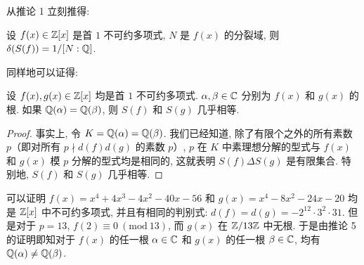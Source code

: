 从推论 1 立刻推得: 

\begin{corollary}[4]
设 $f(x)\in\mathbb{Z}[x]$ 是首 $1$ 不可约多项式, $N$ 是 $f(x)$ 的分裂域, 则 $\delta(S(f))=1/[N:\mathbb{Q}]$. 
\end{corollary}

同样地可以证得: 

\begin{corollary}[5]
设 $f(x),g(x)\in\mathbb{Z}[x]$ 均是首 $1$ 不可约多项式. $\alpha,\beta\in\mathbb{C}$ 分别为 $f(x)$ 和 $g(x)$ 的根. 如果 $\mathbb{Q}(\alpha)=\mathbb{Q}(\beta)$, 则 $S(f)$ 和 $S(g)$ 几乎相等. 
\end{corollary}

\begin{proof}
事实上, 令 $K=\mathbb{Q}(\alpha)=\mathbb{Q}(\beta)$. 我们已经知道, 除了有限个之外的所有素数 $p$（即对所有 $p\nmid d(f)d(g)$ 的素数 $p$）, $p$ 在 $K$ 中素理想分解的型式与 $f(x)$ 和 $g(x)$ 模 $p$ 分解的型式均是相同的, 这就表明 $S(f)\Delta S(g)$ 是有限集合. 特别地, $S(f)$ 和 $S(g)$ 几乎相等. 
\end{proof}

\begin{example}
可以证明 $f(x)=x^4+4x^3-4x^2-40x-56$ 和 $g(x)=x^4-8x^2-24x-20$ 均是 $\mathbb{Z}[x]$ 中不可约多项式, 并且有相同的判别式: $d(f)=d(g)=-2^{12}\cdot3^2\cdot31$. 但是对于 $p=13$, $f(2)\equiv 0\ (\mathrm{mod}\ 13)$, 而 $g(x)$ 在 $\mathbb{Z}/13\mathbb{Z}$ 中无根. 于是由推论 5 的证明即知对于 $f(x)$ 的任一根 $\alpha\in\mathbb{C}$ 和 $g(x)$ 的任一根 $\beta\in\mathbb{C}$, 均有 $\mathbb{Q}(\alpha)\neq\mathbb{Q}(\beta)$. 
\end{example}
